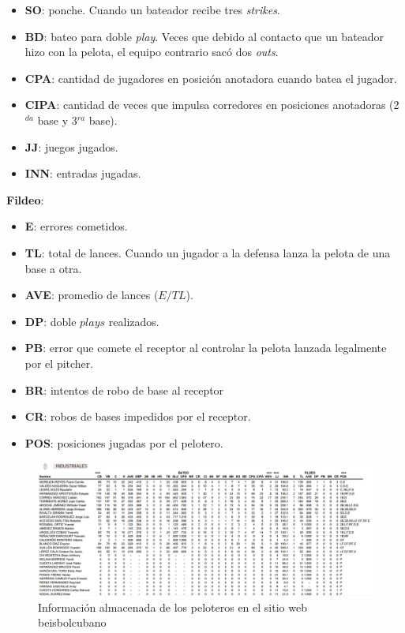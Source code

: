 \begin{itemize}
	\item \textbf{SO}: ponche. Cuando un bateador recibe tres \textit{strikes}.
	\item \textbf{BD}: bateo para doble \textit{play}. Veces que debido al contacto que un bateador hizo con la pelota, el equipo contrario sacó dos \textit{outs}.
	\item \textbf{CPA}: cantidad de jugadores en posición anotadora cuando batea el jugador.
	\item \textbf{CIPA}: cantidad de veces que impulsa corredores en posiciones anotadoras (2$^{da}$ base y 3$^{ra}$ base).
	\item \textbf{JJ}: juegos jugados.
	\item \textbf{INN}: entradas jugadas.
\end{itemize}
\large{\textbf{Fildeo}:}
\normalsize
\begin{itemize}
	\item \textbf{E}: errores cometidos.
	\item \textbf{TL}: total de lances. Cuando un jugador a la defensa lanza la pelota de una base a otra. 
	\item \textbf{AVE}: promedio de lances ($E/TL$).
	\item \textbf{DP}: doble $ plays $ realizados.
	\item \textbf{PB}: error que comete el receptor al controlar la pelota lanzada legalmente por el pitcher.
	\item \textbf{BR}: intentos de robo de base al receptor
	\item \textbf{CR}: robos de bases impedidos por el receptor.
	\item \textbf{POS}: posiciones jugadas por el pelotero.
\end{itemize}

\newpage
{}
\recalctypearea
\begin{figure} [H]
  \hspace{-2.7cm}  
	\includegraphics[width=1.3\textwidth]{figuras/informacionPelota.png}
	\caption{Información almacenada de los peloteros en el sitio web beisbolcubano \cite{INDER2020}}\label{info-pelota}
\end{figure}

